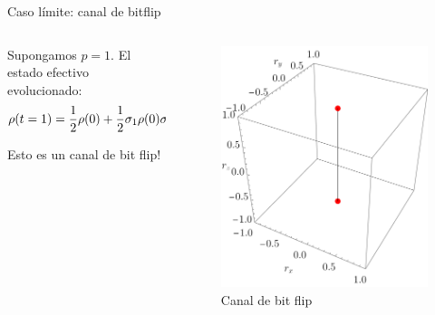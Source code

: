 \begin{frame}{Caso límite: canal de bitflip}
    \begin{columns}
        \begin{column}{0.5\textwidth}
            Supongamos $p=1$. El estado efectivo evolucionado:
            \begin{equation*}
              \rho(t=1)=\frac{1}{2}\rho(0)+\frac{1}{2}\sigma_{1}\rho(0)\sigma_{1}.
            \end{equation*}
        
            Esto es un canal de bit flip!
        \end{column}
        \begin{column}{0.5\textwidth}
            \begin{figure}[h!]
                \centering
                \includegraphics[width=0.7\linewidth]{figures/maxent_results/CNOT_p=1._t=1_r=0.9.png}
                \caption{Canal de bit flip}
                \label{fig:SWAPFactor2D}
              \end{figure}
        \end{column}
    \end{columns}
\end{frame}
